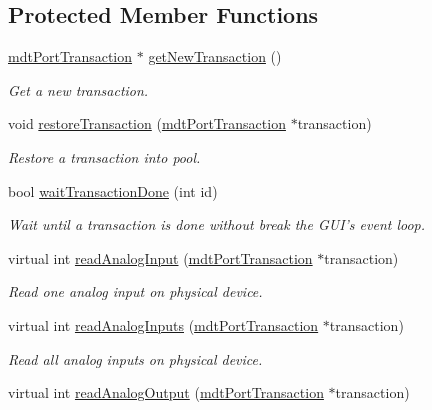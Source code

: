 \subsection*{Protected Member Functions}
\begin{DoxyCompactItemize}
\item 
\hyperlink{classmdt_port_transaction}{mdt\-Port\-Transaction} $\ast$ \hyperlink{classmdt_multi_io_device_aabc890d0758a6e3e629c589a07d1c7fb}{get\-New\-Transaction} ()
\begin{DoxyCompactList}\small\item\em Get a new transaction. \end{DoxyCompactList}\item 
void \hyperlink{classmdt_multi_io_device_a3c5f8852d25fa9435e77257347e639da}{restore\-Transaction} (\hyperlink{classmdt_port_transaction}{mdt\-Port\-Transaction} $\ast$transaction)
\begin{DoxyCompactList}\small\item\em Restore a transaction into pool. \end{DoxyCompactList}\item 
bool \hyperlink{classmdt_multi_io_device_a37a3f39a36b3bbd383f4f704193e3955}{wait\-Transaction\-Done} (int id)
\begin{DoxyCompactList}\small\item\em Wait until a transaction is done without break the G\-U\-I's event loop. \end{DoxyCompactList}\item 
virtual int \hyperlink{classmdt_multi_io_device_ad49b5054981b91bab6e10de7d049c709}{read\-Analog\-Input} (\hyperlink{classmdt_port_transaction}{mdt\-Port\-Transaction} $\ast$transaction)
\begin{DoxyCompactList}\small\item\em Read one analog input on physical device. \end{DoxyCompactList}\item 
virtual int \hyperlink{classmdt_multi_io_device_ad54b0b3a533f3e739f4add183932a5cd}{read\-Analog\-Inputs} (\hyperlink{classmdt_port_transaction}{mdt\-Port\-Transaction} $\ast$transaction)
\begin{DoxyCompactList}\small\item\em Read all analog inputs on physical device. \end{DoxyCompactList}\item 
virtual int \hyperlink{classmdt_multi_io_device_a5bfebd15d85c5b0f0d92cd49e49e862d}{read\-Analog\-Output} (\hyperlink{classmdt_port_transaction}{mdt\-Port\-Transaction} $\ast$transaction)

\end{DoxyCompactItemize}
